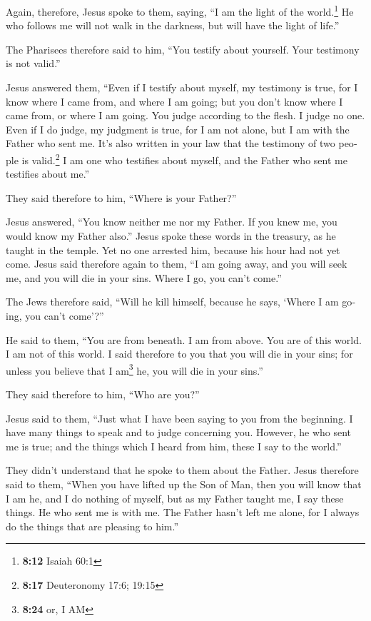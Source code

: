 \begin{paracol}{2}
\begin{otherlanguage}{english}
 Again, therefore, Jesus spoke to them, saying, ``I am
the light of the world.\footnote{\textbf{8:12} Isaiah 60:1} He who
follows me will not walk in the darkness, but will have the light of
life.''

 The Pharisees therefore said to him, ``You testify about
yourself. Your testimony is not valid.''

 Jesus answered them, ``Even if I testify about myself,
my testimony is true, for I know where I came from, and where I am
going; but you don't know where I came from, or where I am going.
 You judge according to the flesh. I judge no one.
 Even if I do judge, my judgment is true, for I am not
alone, but I am with the Father who sent me.  It's also
written in your law that the testimony of two people is
valid.\footnote{\textbf{8:17} Deuteronomy 17:6; 19:15}  I
am one who testifies about myself, and the Father who sent me testifies
about me.''

 They said therefore to him, ``Where is your Father?''

Jesus answered, ``You know neither me nor my Father. If you knew me, you
would know my Father also.''  Jesus spoke these words in
the treasury, as he taught in the temple. Yet no one arrested him,
because his hour had not yet come.  Jesus said therefore
again to them, ``I am going away, and you will seek me, and you will die
in your sins. Where I go, you can't come.''

 The Jews therefore said, ``Will he kill himself, because
he says, `Where I am going, you can't come'?''

 He said to them, ``You are from beneath. I am from
above. You are of this world. I am not of this world.  I
said therefore to you that you will die in your sins; for unless you
believe that I am\footnote{\textbf{8:24} or, I AM} he, you will die in
your sins.''

 They said therefore to him, ``Who are you?''

Jesus said to them, ``Just what I have been saying to you from the
beginning.  I have many things to speak and to judge
concerning you. However, he who sent me is true; and the things which I
heard from him, these I say to the world.''

 They didn't understand that he spoke to them about the
Father.  Jesus therefore said to them, ``When you have
lifted up the Son of Man, then you will know that I am he, and I do
nothing of myself, but as my Father taught me, I say these things.
 He who sent me is with me. The Father hasn't left me
alone, for I always do the things that are pleasing to him.''


\end{otherlanguage}
\end{paracol}
